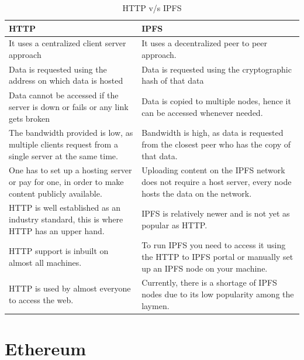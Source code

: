 \begin{table}[H]
    \normalsize
    \begin{center}
    \begin{tabular}{|m{7cm}| m{7cm}|}
        \hline
        \textbf{HTTP} & \textbf{IPFS} \\
        \hline
        It uses a centralized client server approach &
It uses a decentralized peer to peer approach.\\
        \hline
        Data is requested using the address on which data is hosted &
Data is requested using the cryptographic hash of that data \\
        \hline
        Data cannot be accessed if the server is down or fails or any link gets broken & 
Data is copied to multiple nodes, hence it can be accessed whenever needed.\\
        \hline
        The bandwidth provided is low, as multiple clients request from a single server at the same time. &
        Bandwidth is high, as data is requested from the closest peer who has the copy of that data.\\
        \hline
        One has to set up a hosting server or pay for one, in order to make content publicly available. &
Uploading content on the IPFS network does not require a host server, every node hosts the data on the network.\\
        \hline
        HTTP is well established as an industry standard, this is where HTTP has an upper hand. &
IPFS is relatively newer and is not yet as popular as HTTP.\\
\hline 
HTTP support is inbuilt on almost all machines. &
To run IPFS you need to access it using the HTTP to IPFS portal or manually set up an IPFS node on your machine.\\

\hline
HTTP is used by almost everyone to access the web.	&
Currently, there is a shortage of IPFS nodes due to its low popularity among the laymen.\\
\hline
    \end{tabular}  
    \caption{HTTP v/s IPFS}
    \label{table-example}
    \end{center}
    \end{table}

\section{Ethereum}

